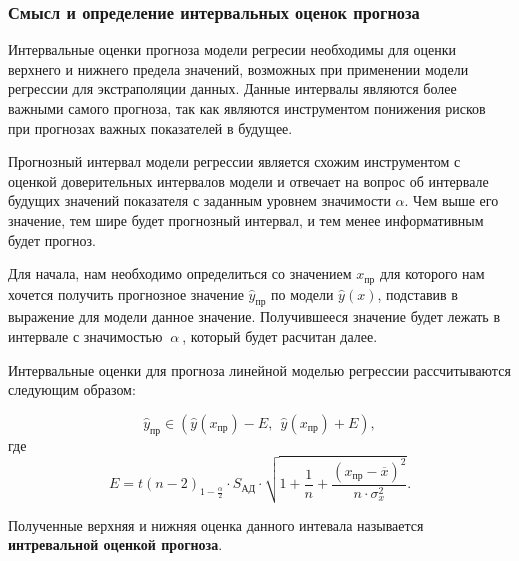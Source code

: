 \documentclass[
]{article}
\begin{document}
\hypertarget{ux441ux43cux44bux441ux43b-ux438-ux43eux43fux440ux435ux434ux435ux43bux435ux43dux438ux435-ux438ux43dux442ux435ux440ux432ux430ux43bux44cux43dux44bux445-ux43eux446ux435ux43dux43eux43a-ux43fux440ux43eux433ux43dux43eux437ux430}{%
\subsubsection{\texorpdfstring{\textbf{Смысл и определение интервальных
оценок
прогноза}}{Смысл и определение интервальных оценок прогноза}}\label{ux441ux43cux44bux441ux43b-ux438-ux43eux43fux440ux435ux434ux435ux43bux435ux43dux438ux435-ux438ux43dux442ux435ux440ux432ux430ux43bux44cux43dux44bux445-ux43eux446ux435ux43dux43eux43a-ux43fux440ux43eux433ux43dux43eux437ux430}}

Интервальные оценки прогноза модели регресии необходимы для оценки
верхнего и нижнего предела значений, возможных при применении модели
регрессии для экстраполяции данных. Данные интервалы являются более
важными самого прогноза, так как являются инструментом понижения рисков
при прогнозах важных показателей в будущее.

Прогнозный интервал модели регрессии является схожим инструментом с
оценкой доверительных интервалов модели и отвечает на вопрос об
интервале будущих значений показателя с заданным уровнем значимости
\(\alpha\). Чем выше его значение, тем шире будет прогнозный интервал, и
тем менее информативным будет прогноз.

Для начала, нам необходимо определиться со значением \(x_{пр}\) для
которого нам хочется получить прогнозное значение \(\hat{y}_{пр}\) по
модели \(\hat{y}(x)\), подставив в выражение для модели данное значение.
Получившееся значение будет лежать в интервале с значимостью
\(\ \alpha\ \), который будет расчитан далее.

Интервальные оценки для прогноза линейной моделью регрессии
рассчитываются следующим образом:

\[
\hat{y}_{пр} \in \left( \hat{y}(x_{пр}) - E,\ \  \hat{y}(x_{пр}) + E  \right),
\] где \[
E = t(n-2)_{1 - \frac{\alpha}{2}} \cdot S_{\text{АД}} \cdot \sqrt{1 + \frac{1}{n} + \frac{\left(x_{пр} - \overline{x}\right)^2}{n \cdot \sigma_x^2}}.
\]

Полученные верхняя и нижняя оценка данного интевала называется
\textbf{интревальной оценкой прогноза}.
\end{document}
